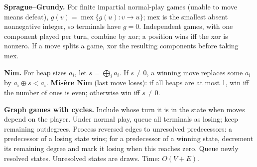 {\footnotesize
\textbf{Sprague--Grundy.}
For finite impartial normal-play games (unable to move means defeat),
$g(v)=\operatorname{mex}\{g(u):v\to u\}$;
mex is the smallest absent nonnegative integer, so terminals have $g=0$.
Independent games, with one component played per turn, combine by xor;
a position wins iff the xor is nonzero. If a move splits a game,
xor the resulting components before taking mex.

\textbf{Nim.}
For heap sizes $a_i$, let $s=\bigoplus_i a_i$.
If $s\ne0$, a winning move replaces some $a_i$ by $a_i\oplus s<a_i$.
\textbf{Mis\`ere Nim} (last move loses): if all heaps are at most 1,
win iff the number of ones is even; otherwise win iff $s\ne0$.

\textbf{Graph games with cycles.}
Include whose turn it is in the state when moves depend on the player.
Under normal play, queue all terminals as losing; keep remaining outdegrees.
Process reversed edges to unresolved predecessors: a predecessor of a losing
state wins; for a predecessor of a winning state, decrement its remaining
degree and mark it losing when this reaches zero. Queue newly resolved
states. Unresolved states are draws. Time: $O(V+E)$.\par
}
